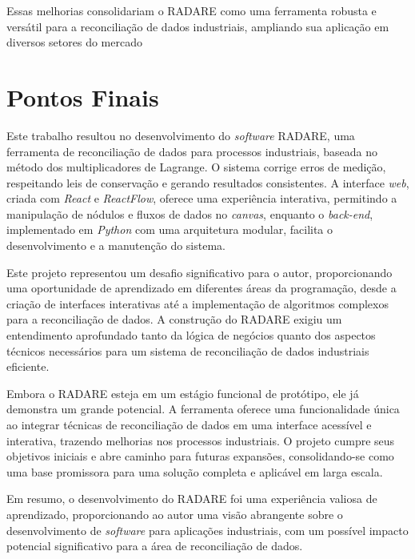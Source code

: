 Essas melhorias consolidariam o RADARE como uma ferramenta robusta e versátil para a reconciliação de dados industriais, ampliando sua aplicação em diversos setores do mercado

\section{Pontos Finais}

Este trabalho resultou no desenvolvimento do \textit{software} RADARE, uma ferramenta de reconciliação de dados para processos industriais, baseada no método dos multiplicadores de Lagrange. O sistema corrige erros de medição, respeitando leis de conservação e gerando resultados consistentes. A interface \textit{web}, criada com \textit{React} e \textit{ReactFlow}, oferece uma experiência interativa, permitindo a manipulação de nódulos e fluxos de dados no \textit{canvas}, enquanto o \textit{back-end}, implementado em \textit{Python} com uma arquitetura modular, facilita o desenvolvimento e a manutenção do sistema.

Este projeto representou um desafio significativo para o autor, proporcionando uma oportunidade de aprendizado em diferentes áreas da programação, desde a criação de interfaces interativas até a implementação de algoritmos complexos para a reconciliação de dados. A construção do RADARE exigiu um entendimento aprofundado tanto da lógica de negócios quanto dos aspectos técnicos necessários para um sistema de reconciliação de dados industriais eficiente.

Embora o RADARE esteja em um estágio funcional de protótipo, ele já demonstra um grande potencial. A ferramenta oferece uma funcionalidade única ao integrar técnicas de reconciliação de dados em uma interface acessível e interativa, trazendo melhorias nos processos industriais. O projeto cumpre seus objetivos iniciais e abre caminho para futuras expansões, consolidando-se como uma base promissora para uma solução completa e aplicável em larga escala.

Em resumo, o desenvolvimento do RADARE foi uma experiência valiosa de aprendizado, proporcionando ao autor uma visão abrangente sobre o desenvolvimento de \textit{software} para aplicações industriais, com um possível impacto potencial significativo para a área de reconciliação de dados.
